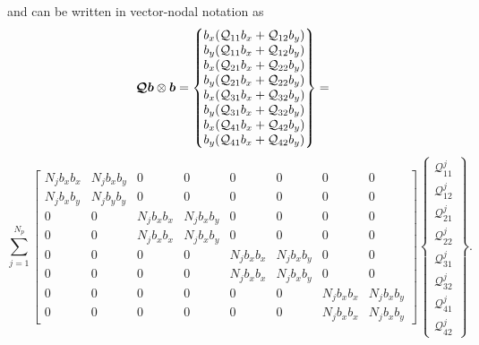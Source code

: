 \documentclass[a4paper,10pt]{article}
\newcommand{\bm}[1]{\text{\boldmath$#1$\unboldmath}}
\renewcommand{\b}{\bm{b}}
\newcommand{\SecOrdTens}[1]{\bm{\mathcal{#1}}}
\newcommand{\G}{\SecOrdTens{Q}}
\begin{document}
and can be written in vector-nodal notation as 
\[
 \G \b \otimes \b =
 \begin{Bmatrix}
  b_x (\mathcal{Q}_{11}b_x + \mathcal{Q}_{12}b_y ) \\
  b_y (\mathcal{Q}_{11}b_x + \mathcal{Q}_{12}b_y ) \\
  b_x (\mathcal{Q}_{21}b_x + \mathcal{Q}_{22}b_y ) \\
  b_y (\mathcal{Q}_{21}b_x + \mathcal{Q}_{22}b_y ) \\
  b_x (\mathcal{Q}_{31}b_x + \mathcal{Q}_{32}b_y ) \\
  b_y (\mathcal{Q}_{31}b_x + \mathcal{Q}_{32}b_y ) \\
  b_x (\mathcal{Q}_{41}b_x + \mathcal{Q}_{42}b_y ) \\
  b_y (\mathcal{Q}_{41}b_x + \mathcal{Q}_{42}b_y ) 
\end{Bmatrix}=
\]
\[
\sum_{j=1}^{N_p} \begin{bmatrix}
            N_j b_x b_x  &  N_j b_x b_y  &       0       &       0       &       0       &       0       &       0       &       0       \\ 
            N_j b_x b_y  &  N_j b_y b_y  &       0       &       0       &       0       &       0       &       0       &       0       \\ 
                  0      &       0       &  N_j b_x b_x  &  N_j b_x b_y  &       0       &       0       &       0       &       0       \\ 
                  0      &       0       &  N_j b_x b_x  &  N_j b_x b_y  &       0       &       0       &       0       &       0       \\ 
                  0      &       0       &       0       &       0       &  N_j b_x b_x  &  N_j b_x b_y  &       0       &       0       \\ 
                  0      &       0       &       0       &       0       &  N_j b_x b_x  &  N_j b_x b_y  &       0       &       0       \\ 
                  0      &       0       &       0       &       0       &       0       &       0       &  N_j b_x b_x  &  N_j b_x b_y  \\ 
                  0      &       0       &       0       &       0       &       0       &       0       &  N_j b_x b_x  &  N_j b_x b_y   
                 \end{bmatrix} 
\begin{Bmatrix}
  \mathcal{Q}_{11}^j\\
  \mathcal{Q}_{12}^j\\
  \mathcal{Q}_{21}^j\\
  \mathcal{Q}_{22}^j\\               
  \mathcal{Q}_{31}^j\\
  \mathcal{Q}_{32}^j\\
  \mathcal{Q}_{41}^j\\
  \mathcal{Q}_{42}^j
\end{Bmatrix}.                
\]
\end{document}
